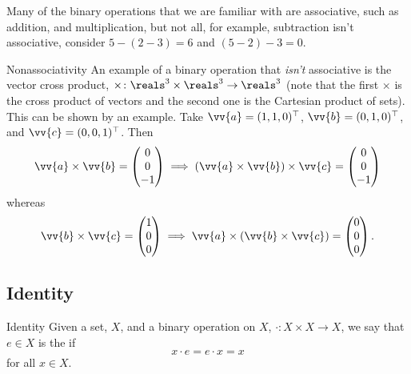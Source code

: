 Many of the binary operations that we are familiar with are associative, such as addition, and multiplication, but not all, for example, subtraction isn't associative, consider \(5 - (2 - 3) = 6\) and \((5 - 2) - 3 = 0\).

\begin{exm}{Nonassociativity}{}
    An example of a binary operation that \emph{isn't} associative is the vector cross product, \(\times\colon\reals^3 \times \reals^3 \to \reals^3\) (note that the first \(\times\) is the cross product of vectors and the second one is the Cartesian product of sets).
    This can be shown by an example.
    Take \(\vv{a} = (1, 1, 0)^\trans\), \(\vv{b} = (0, 1, 0)^\trans\), and \(\vv{c} = (0, 0, 1)^\trans\).
    Then
    \begin{equation}
        \vv{a} \times \vv{b} = 
        \begin{pmatrix}
            0\\ 0\\ -1
        \end{pmatrix}
        \implies (\vv{a} \times \vv{b}) \times \vv{c} = 
        \begin{pmatrix}
            0\\ 0\\ -1
        \end{pmatrix}
    \end{equation}
    whereas
    \begin{equation}
        \vv{b} \times \vv{c} = 
        \begin{pmatrix}
            1\\ 0\\ 0
        \end{pmatrix}
        \implies \vv{a} \times (\vv{b} \times \vv{c}) = 
        \begin{pmatrix}
            0\\ 0\\ 0
        \end{pmatrix}
        .
    \end{equation}
\end{exm}

\subsection{Identity}
\begin{dfn}{Identity}{}
    Given a set, \(X\), and a binary operation on \(X\), \(\cdot \colon X \times X \to X\), we say that \(e \in X\) is the  if
    \begin{equation}
        x \cdot e = e \cdot x = x
    \end{equation}
    for all \(x \in X\).
\end{dfn}

